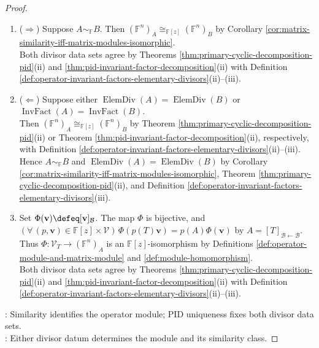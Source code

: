 \begin{theorem}
\begin{proof}
\begin{enumerate}[label=(\roman*)]
\item[$(ii)$] ($\Rightarrow$) Suppose $A\sim_{\mathbb{F}}B$. Then $(\mathbb{F}^n)_A\cong_{\mathbb{F}[z]}(\mathbb{F}^n)_B$ by Corollary \ref{cor:matrix-similarity-iff-matrix-modules-isomorphic}.\\
Both divisor data sets agree by Theorems \ref{thm:primary-cyclic-decomposition-pid}(ii) and \ref{thm:pid-invariant-factor-decomposition}(ii) with Definition \ref{def:operator-invariant-factors-elementary-divisors}(ii)--(iii).
\item[$(ii)$] ($\Leftarrow$) Suppose either $\operatorname{ElemDiv}(A)=\operatorname{ElemDiv}(B)$ or $\operatorname{InvFact}(A)=\operatorname{InvFact}(B)$.\\
Then $(\mathbb{F}^n)_A\cong_{\mathbb{F}[z]}(\mathbb{F}^n)_B$ by Theorem \ref{thm:primary-cyclic-decomposition-pid}(ii) or Theorem \ref{thm:pid-invariant-factor-decomposition}(ii), respectively, with Definition \ref{def:operator-invariant-factors-elementary-divisors}(ii)--(iii).\\
Hence $A\sim_{\mathbb{F}}B$ and $\operatorname{ElemDiv}(A)=\operatorname{ElemDiv}(B)$ by Corollary \ref{cor:matrix-similarity-iff-matrix-modules-isomorphic}, Theorem \ref{thm:primary-cyclic-decomposition-pid}(ii), and Definition \ref{def:operator-invariant-factors-elementary-divisors}(iii).
\item[$(iii)$] Set $\Phi(\mathbf{v})\defeq[\mathbf{v}]_{\mathcal{B}}$. The map $\Phi$ is bijective, and $(\forall\,(p,\mathbf{v})\in\mathbb{F}[z]\times\mathcal{V})\,\Phi(p(T)\mathbf{v})=p(A)\Phi(\mathbf{v})$ by $A=[T]_{\mathcal{B}\leftarrow\mathcal{B}}$.\\
Thus $\Phi:\mathcal{V}_T\to(\mathbb{F}^n)_A$ is an $\mathbb{F}[z]$-isomorphism by Definitions \ref{def:operator-module-and-matrix-module} and \ref{def:module-homomorphism}.\\
Both divisor data sets agree by Theorems \ref{thm:primary-cyclic-decomposition-pid}(ii) and \ref{thm:pid-invariant-factor-decomposition}(ii) with Definition \ref{def:operator-invariant-factors-elementary-divisors}(ii)--(iii).
\end{enumerate}
: Similarity identifies the operator module; PID uniqueness fixes both divisor data sets.\\
: Either divisor datum determines the module and its similarity class.
\end{proof}
\end{theorem}

